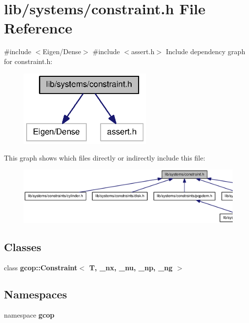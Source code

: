 \section{lib/systems/constraint.h \-File \-Reference}
\label{constraint_8h}
{\ttfamily \#include $<$\-Eigen/\-Dense$>$}\*
{\ttfamily \#include $<$assert.\-h$>$}\*
\-Include dependency graph for constraint.\-h\-:\nopagebreak
\begin{figure}[H]
\begin{center}
\leavevmode
\includegraphics[width=186pt]{constraint_8h__incl}
\end{center}
\end{figure}
\-This graph shows which files directly or indirectly include this file\-:\nopagebreak
\begin{figure}[H]
\begin{center}
\leavevmode
\includegraphics[width=350pt]{constraint_8h__dep__incl}
\end{center}
\end{figure}
\subsection*{\-Classes}
\begin{DoxyCompactItemize}
\item 
class {\bf gcop\-::\-Constraint$<$ T, \-\_\-nx, \-\_\-nu, \-\_\-np, \-\_\-ng $>$}
\end{DoxyCompactItemize}
\subsection*{\-Namespaces}
\begin{DoxyCompactItemize}
\item 
namespace {\bf gcop}
\end{DoxyCompactItemize}
